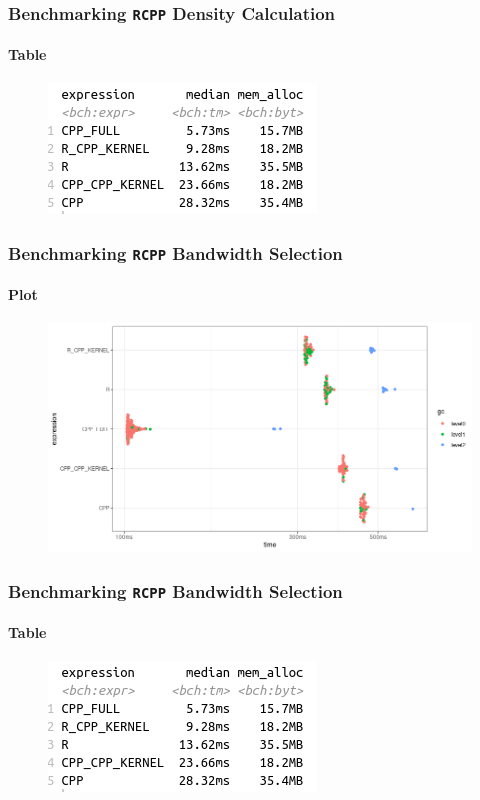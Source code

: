 \documentclass[aspectratio=169]{beamer}
\begin{document}
\begin{frame}
  \frametitle{Benchmarking \texttt{RCPP} Density Calculation}
  \framesubtitle{Table}
  \begin{figure}
    \centering
    \includegraphics[scale = 0.7]{figure/table_R_RCPP_dens.png}  
  \end{figure}
\end{frame}
\begin{frame}
  \frametitle{Benchmarking \texttt{RCPP} Bandwidth Selection}
  \framesubtitle{Plot}
  \begin{figure}
    \centering
    \includegraphics[scale = 0.5]{figure/RCPP_R_CV.png}  
  \end{figure}
\end{frame}
\begin{frame}
  \frametitle{Benchmarking \texttt{RCPP} Bandwidth Selection}
  \framesubtitle{Table}
  \begin{figure}
    \centering
    \includegraphics[scale = 0.7]{figure/table_R_RCPP_dens.png}  
  \end{figure}
\end{frame}
\end{document}
